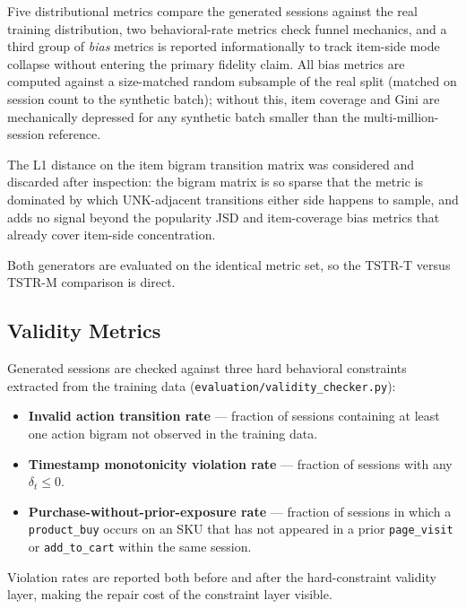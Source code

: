 \documentclass[sigconf,nonacm]{acmart}
\begin{document}
Five distributional metrics compare the generated sessions against the
real training distribution, two behavioral-rate metrics check funnel
mechanics, and a third group of \textit{bias} metrics is reported
informationally to track item-side mode collapse without entering the
primary fidelity claim. All bias metrics are computed against a
size-matched random subsample of the real split (matched on session
count to the synthetic batch); without this, item coverage and Gini are
mechanically depressed for any synthetic batch smaller than the
multi-million-session reference.

The L1 distance on the item bigram transition matrix was considered and
discarded after inspection: the bigram matrix is so sparse that the metric is dominated
by which UNK-adjacent transitions either side happens to sample, and
adds no signal beyond the popularity JSD and item-coverage bias metrics
that already cover item-side concentration.

Both generators are evaluated on the identical metric set, so the
TSTR-T versus TSTR-M comparison is direct.

\subsection{Validity Metrics}
\label{sec:validity-metrics}
Generated sessions are checked against three hard behavioral constraints
extracted from the training data
(\texttt{evaluation/validity\_checker.py}):
\begin{itemize}[leftmargin=*]
  \item \textbf{Invalid action transition rate} — fraction of sessions
    containing at least one action bigram not observed in the training
    data.
  \item \textbf{Timestamp monotonicity violation rate} — fraction of
    sessions with any $\delta_t \le 0$.
  \item \textbf{Purchase-without-prior-exposure rate} — fraction of
    sessions in which a \texttt{product\_buy} occurs on an SKU that has
    not appeared in a prior \texttt{page\_visit} or \texttt{add\_to\_cart}
    within the same session.
\end{itemize}
Violation rates are reported both before and after the
hard-constraint validity layer, making the repair cost of the constraint
layer visible.
\end{document}
